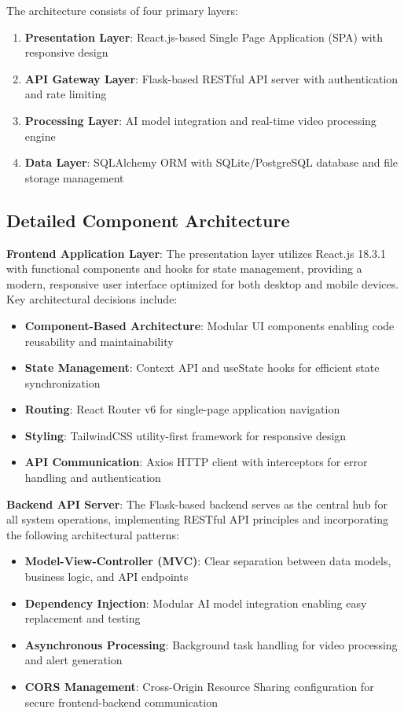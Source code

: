 \documentclass[12pt,a4paper]{article}
\begin{document}
The architecture consists of four primary layers:

\begin{enumerate}
    \item \textbf{Presentation Layer}: React.js-based Single Page Application (SPA) with responsive design
    \item \textbf{API Gateway Layer}: Flask-based RESTful API server with authentication and rate limiting
    \item \textbf{Processing Layer}: AI model integration and real-time video processing engine
    \item \textbf{Data Layer}: SQLAlchemy ORM with SQLite/PostgreSQL database and file storage management
\end{enumerate}

\subsection{Detailed Component Architecture}

\textbf{Frontend Application Layer}:
The presentation layer utilizes React.js 18.3.1 with functional components and hooks for state management, providing a modern, responsive user interface optimized for both desktop and mobile devices. Key architectural decisions include:

\begin{itemize}
    \item \textbf{Component-Based Architecture}: Modular UI components enabling code reusability and maintainability
    \item \textbf{State Management}: Context API and useState hooks for efficient state synchronization
    \item \textbf{Routing}: React Router v6 for single-page application navigation
    \item \textbf{Styling}: TailwindCSS utility-first framework for responsive design
    \item \textbf{API Communication}: Axios HTTP client with interceptors for error handling and authentication
\end{itemize}

\textbf{Backend API Server}:
The Flask-based backend serves as the central hub for all system operations, implementing RESTful API principles and incorporating the following architectural patterns:

\begin{itemize}
    \item \textbf{Model-View-Controller (MVC)}: Clear separation between data models, business logic, and API endpoints
    \item \textbf{Dependency Injection}: Modular AI model integration enabling easy replacement and testing
    \item \textbf{Asynchronous Processing}: Background task handling for video processing and alert generation
    \item \textbf{CORS Management}: Cross-Origin Resource Sharing configuration for secure frontend-backend communication
\end{itemize}
\end{document}
